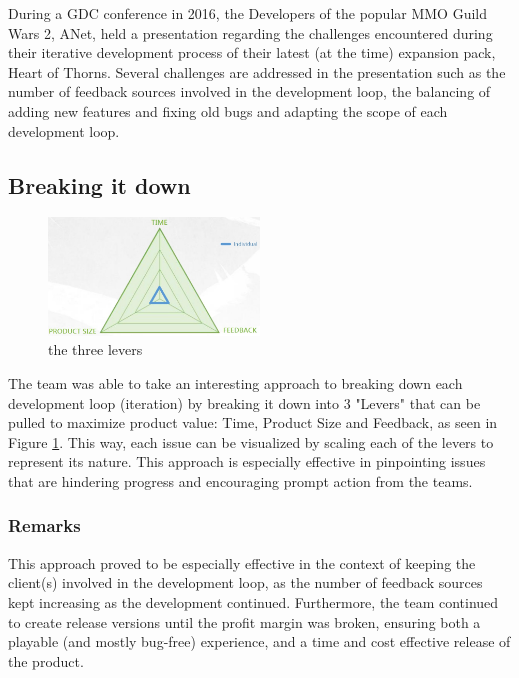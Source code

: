 \documentclass{scrartcl}
\begin{document}
    During a GDC conference in 2016, the Developers of the popular MMO Guild Wars 2, ANet, held a presentation regarding the challenges encountered during their iterative development process of their latest (at the time) expansion pack, Heart of Thorns. Several challenges are addressed in the presentation such as the number of feedback sources involved in the development loop, the balancing of adding new features and fixing old bugs and adapting the scope of each development loop.
    
    \newpage
    
    \subsection{Breaking it down}
    
    \begin{figure}
        \centering
        \includegraphics[width=0.5\textwidth]{Loop.jpg}
        \caption{the three levers}
        \label{fig:loop}
    \end{figure}
    
    The team was able to take an interesting approach to breaking down each development loop (iteration) by breaking it down into 3 "Levers" that can be pulled to maximize product value: Time, Product Size and Feedback, as seen in Figure \ref{fig:loop}. This way, each issue can be visualized by scaling each of the levers to represent its nature. This approach is especially effective in pinpointing issues that are hindering progress and encouraging prompt action from the teams.
    
    \subsubsection{Remarks}
    
    This approach proved to be especially effective in the context of keeping the client(s) involved in the development loop, as the number of feedback sources kept increasing as the development continued. Furthermore, the team continued to create release versions until the profit margin was broken, ensuring both a playable (and mostly bug-free) experience, and a time and cost effective release of the product.
    
\end{document}
